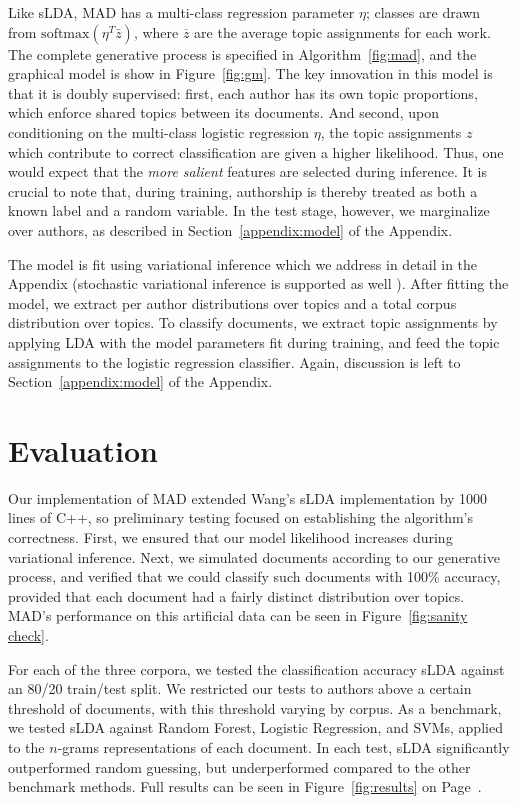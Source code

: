 \documentclass[14pt]{article} %
\theoremstyle{plain}
\theoremstyle{definition}
\theoremstyle{remark}
\begin{document}
Like sLDA, MAD has a multi-class regression parameter $\eta$; classes are drawn from $\text{softmax}(\eta^T\bar{z})$, where $\overline{z}$ are the average topic assignments for each work. The complete generative process is specified in Algorithm~\ref{fig:mad}, and the graphical model is show in Figure~\ref{fig:gm}. The key innovation in this model is that it is doubly supervised: first, each author has its own topic proportions, which enforce shared topics between its documents. And second, upon conditioning on the multi-class logistic regression $\eta$, the topic assignments $z$ which contribute to correct classification are given a higher likelihood.  Thus, one would expect that the \emph{more salient} features are selected during inference. It is crucial to note that, during training, authorship is thereby treated as both a known label and a random variable. In the test stage, however, we marginalize over authors, as described in Section~\ref{appendix:model} of the Appendix.

The model is fit using variational inference \cite{wainwright2008graphical} which we address in detail in the Appendix (stochastic variational inference is supported as well \cite{hoffman2013stochastic}). After fitting the model, we extract per author distributions over topics and a total corpus distribution over topics. To classify documents, we extract topic assignments by applying LDA with the model parameters fit during training, and feed the topic assignments to the logistic regression classifier. Again, discussion is left to Section~\ref{appendix:model} of the Appendix. 

\section{Evaluation}

Our implementation of MAD extended Wang's sLDA implementation by 1000 lines of C++, so preliminary testing focused on establishing the algorithm's correctness. First, we ensured that our model likelihood increases during variational inference. Next, we simulated documents according to our generative process, and verified that we could classify such documents with 100\% accuracy, provided that each document had a fairly distinct distribution over topics. MAD's performance on this artificial data can be seen in Figure~\ref{fig:sanity check}. 

For each of the three corpora, we tested the classification accuracy sLDA against an 80/20 train/test split. We restricted our tests to authors above a certain threshold of documents, with this threshold varying by corpus. As a benchmark, we tested sLDA against Random Forest, Logistic Regression, and SVMs, applied to the $n$-grams representations of each document. In each test, sLDA significantly outperformed random guessing, but underperformed compared to the other benchmark methods. Full results can be seen in Figure~\ref{fig:results} on Page~\pageref{fig:results}.
\end{document}

